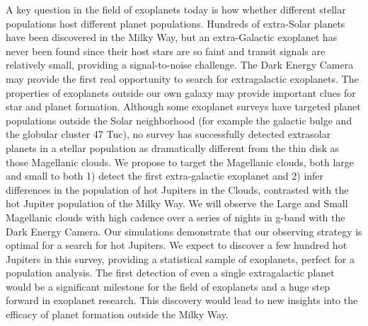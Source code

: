 A key question in the field of exoplanets today is how whether different
stellar populations host different planet populations.
Hundreds of extra-Solar planets have been discovered in the Milky Way, but an
extra-Galactic exoplanet has never been found since their host stars are so
faint and transit signals are relatively small, providing a signal-to-noise
challenge.
The Dark Energy Camera may provide the first real opportunity to
search for extragalactic exoplanets.
The properties of exoplanets outside our own galaxy may provide important
clues for star and planet formation.
Although some exoplanet surveys have targeted planet populations outside the
Solar neighborhood (for example the galactic bulge and the globular cluster 47
Tuc), no survey has successfully detected extrasolar planets in a stellar
population as dramatically different from the thin disk as those Magellanic
clouds.
We propose to target the Magellanic clouds, both large and small to both 1)
detect the first extra-galactic exoplanet and 2) infer differences in the
population of hot Jupiters in the Clouds, contrasted with the hot Jupiter
population of the Milky Way.
We will observe the Large and Small Magellanic clouds with high cadence over a
series of nights in g-band with the Dark Energy Camera.
Our simulations demonstrate that our observing strategy is optimal for a
search for hot Jupiters.
We expect to discover a few hundred hot Jupiters in this survey, providing a
statistical sample of exoplanets, perfect for a population analysis.
The first detection of even a single extragalactic planet would be a
significant milestone for the field of exoplanets and a huge step forward in
exoplanet research.
This discovery would lead to new insights into the efficacy of planet
formation outside the Milky Way.
